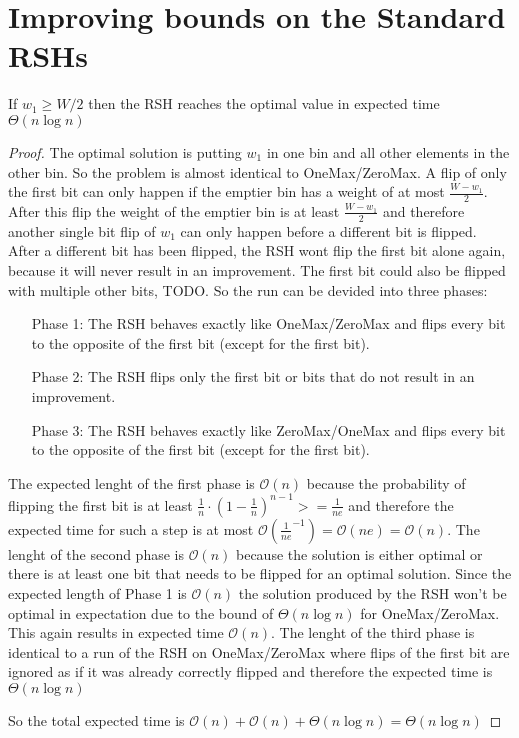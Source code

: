 \section{Improving bounds on the Standard RSHs}
\begin{lemma}\label{OneMaxResult}
If $w_1 \ge W/2$  then the RSH reaches the optimal value in expected time $\Theta(n\log{}n)$
\end{lemma}
\begin{proof}
The optimal solution is putting $w_1$ in one bin and all other elements in the other bin. So the problem is almost identical to OneMax/ZeroMax. A flip of only the first bit can only happen if the emptier bin has a weight of at most $\frac {W-w_1}{2}$. After this flip the weight of the emptier bin is at least $\frac {W-w_1}{2}$ and therefore another single bit flip of $w_1$ can only happen before a different bit is flipped. After a different bit has been flipped, the RSH wont flip the first bit alone again, because it will never result in an improvement. The first bit could also be flipped with multiple other bits, TODO. So the run can be devided into three phases:
\begin{itemize}
    \item[Phase 1:] The RSH behaves exactly like OneMax/ZeroMax and flips every bit to the opposite of the first bit (except for the first bit).
    \item[Phase 2:] The RSH flips only the first bit or bits that do not result in an improvement.
    \item[Phase 3:] The RSH behaves exactly like ZeroMax/OneMax and flips every bit to the opposite of the first bit (except for the first bit).
\end{itemize}

The expected lenght of the first phase is $\mathcal{O}(n)$ because the probability of flipping the first bit is at least ${\frac{1}{n}} \cdot {(1 - \frac{1}{n})}^{n-1} >= \frac{1}{ne}$ and therefore the expected time for such a step is at most $\mathcal{O}(\frac{1}{ne}^{-1}) = \mathcal{O}(ne) = \mathcal{O}(n)$.\newline
The lenght of the second phase is $\mathcal{O}(n)$ because the solution is either optimal or there is at least one bit that needs to be flipped for an optimal solution. Since the expected length of Phase 1 is $\mathcal{O}(n)$ the solution produced by the RSH won't be optimal in expectation due to the bound of $\Theta(n\log{}n)$ for OneMax/ZeroMax. This again results in expected time $\mathcal{O}(n)$.\newline
The lenght of the third phase is identical to a run of the RSH on OneMax/ZeroMax where flips of the first bit are ignored as if it was already correctly flipped and therefore the expected time is $\Theta(n\log{}n)$

So the total expected time is $\mathcal{O}(n) + \mathcal{O}(n) + \Theta(n\log{}n) = \Theta(n\log{}n)$ 
\end{proof}

